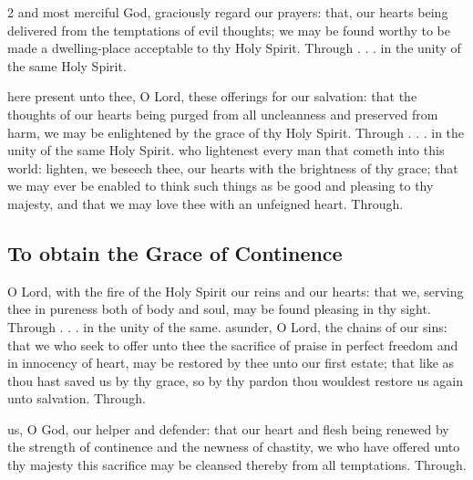 \begin{multicols}{2}
 and most merciful God, graciously regard our prayers: that, our hearts being delivered from the temptations of evil thoughts; we may be found worthy to be made a dwelling-place acceptable to thy Holy Spirit. Through . . . in the unity of the same Holy Spirit.

\vspace{-0.5\baselineskip}

\secret

\vspace{-0.25\baselineskip}

 here present unto thee, O Lord, these offerings for our salvation: that the thoughts of our hearts being purged from all uncleanness and preserved from harm, we may be enlightened by the grace of thy Holy Spirit. Through . . . in the unity of the same Holy Spirit.
\postcommunion
{} who lightenest every man that cometh into this world: lighten, we beseech thee, our hearts with the brightness of thy grace; that we may ever be enabled to think such things as be good and pleasing to thy majesty, and that we may love thee with an unfeigned heart. Through.

\subsection{To obtain the Grace of Continence}
\collect
{} O Lord, with the fire of the Holy Spirit our reins and our hearts: that we, serving thee in pureness both of body and soul, may be found pleasing in thy sight. Through . . . in the unity of the same.
\secret
{} asunder, O Lord, the chains of our sins: that we who seek to offer unto thee the sacrifice of praise in perfect freedom and in innocency of heart, may be restored by thee unto our first estate; that like as thou hast saved us by thy grace, so by thy pardon thou wouldest restore us again unto salvation. Through.

\postcommunion
{} us, O God, our helper and defender: that our heart and flesh being renewed by the strength of continence and the newness of chastity, we who have offered unto thy majesty this sacrifice may be cleansed thereby from all temptations. Through.


\end{multicols}
